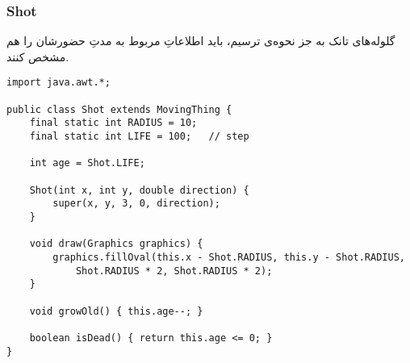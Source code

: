 \documentclass[a4paper,12pt]{paper}
\begin{document}
\subsubsection{\en Shot}
گلوله‌های تانک به جز نحوه‌ی ترسیم، باید اطلاعاتِ مربوط به مدتِ حضورشان را هم مشخص کنند.
\begin{verbatim}
import java.awt.*;

public class Shot extends MovingThing {
	final static int RADIUS = 10;
	final static int LIFE = 100;   // step

	int age = Shot.LIFE;

	Shot(int x, int y, double direction) {
		super(x, y, 3, 0, direction);
	}

	void draw(Graphics graphics) {
		graphics.fillOval(this.x - Shot.RADIUS, this.y - Shot.RADIUS,
			Shot.RADIUS * 2, Shot.RADIUS * 2);
	}

	void growOld() { this.age--; }

	boolean isDead() { return this.age <= 0; }
}
\end{verbatim}
\end{document}
